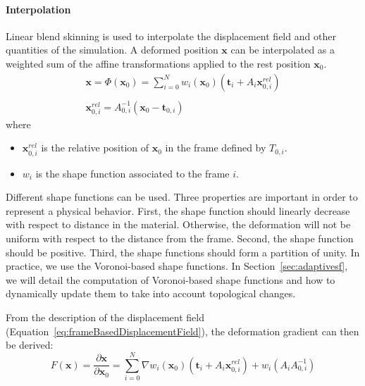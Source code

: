 \paragraph{Interpolation}
Linear blend skinning is used to interpolate the displacement field and other quantities of the simulation. 
A deformed position $\mathbf{x}$ can be interpolated as a weighted sum of the affine transformations applied to the rest position $\mathbf{x}_{0}$.
\begin{equation}
\label{eq:frameBasedDisplacementField}
\begin{array}{l}
\displaystyle \mathbf{x} = \Phi(\mathbf{x}_{0}) = \sum_{i=0}^{N} w_{i}(\mathbf{x}_{0})\left(\mathbf{t}_{i}+A_{i}\mathbf{x}_{0,i}^{rel}\right) \\ \\
\displaystyle \mathbf{x}_{0,i}^{rel} = A_{0,i}^{-1}\left( \mathbf{x}_{0} - \mathbf{t}_{0,i} \right)
\end{array}
\end{equation}
where 
\begin{itemize}
\item $\mathbf{x}_{0,i}^{rel}$ is the relative position of $\mathbf{x}_{0}$ in the frame defined by $T_{0,i}$.
\item $w_{i}$ is the shape function associated to the frame $i$.
\end{itemize}
Different shape functions can be used. Three properties are important in order to represent a physical behavior. 
First, the shape function should linearly decrease with respect to distance in the material. 
Otherwise, the deformation will not be uniform with respect to the distance from the frame. 
Second, the shape function should be positive. 
Third, the shape functions should form a partition of unity. 
In practice, we use the Voronoi-based shape functions.
In Section~\ref{sec:adaptivesf}, we will detail the computation of Voronoi-based shape functions and how to dynamically update them to take into account topological changes.

From the description of the displacement field (Equation~\eqref{eq:frameBasedDisplacementField}), the deformation gradient can then be derived:
\begin{equation}
\displaystyle
F\left(\mathbf{x}\right) = 
\frac{\partial \mathbf{x}}{\partial \mathbf{x}_{0}} =
\sum_{i=0}^{N} \nabla w_{i}(\mathbf{x}_{0}) \left( \mathbf{t}_{i}+A_{i}\mathbf{x}_{0,i}^{rel}\right) + 
w_{i}\left( A_{i}A_{0,i}^{-1} \right)
\end{equation}

